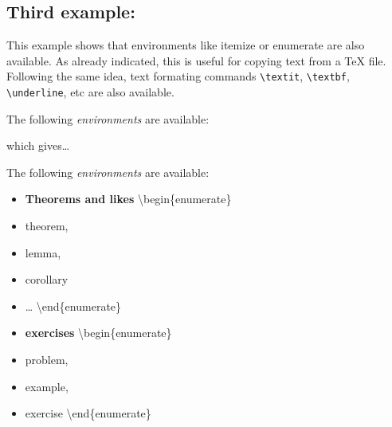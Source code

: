     \subsection{Third example:}\label{third-example}

    This example shows that environments like itemize or enumerate are also
available. As already indicated, this is useful for copying text from a
TeX file. Following the same idea, text formating commands
\texttt{\textbackslash{}textit}, \texttt{\textbackslash{}textbf},
\texttt{\textbackslash{}underline}, etc are also available.

    \begin{listing}
The following \textit{environments} are available:
\end{listing}

    which gives\ldots{}

The following \textit{environments} are available:

\begin{itemize}
\item \textbf{Theorems and likes} \textbackslash{}begin\{enumerate\}
\item theorem, \item lemma, \item corollary \item \ldots{}
\textbackslash{}end\{enumerate\} \item \textbf{exercises}
\textbackslash{}begin\{enumerate\} \item problem, \item example, \item
exercise \textbackslash{}end\{enumerate\}
\end{itemize}

